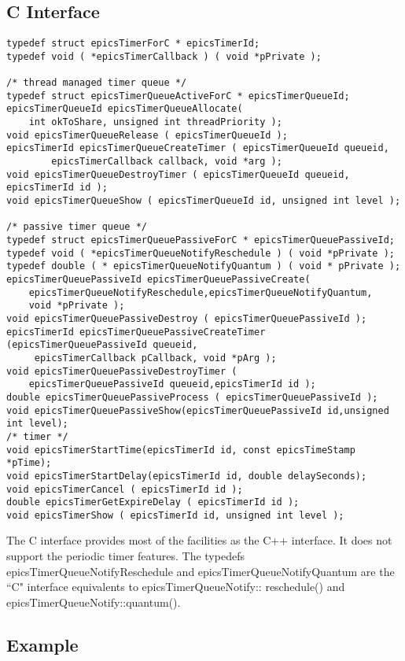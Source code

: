 \subsection{C Interface}

\begin{verbatim}typedef struct epicsTimerForC * epicsTimerId;
typedef void ( *epicsTimerCallback ) ( void *pPrivate );

/* thread managed timer queue */
typedef struct epicsTimerQueueActiveForC * epicsTimerQueueId;
epicsTimerQueueId epicsTimerQueueAllocate(
    int okToShare, unsigned int threadPriority );
void epicsTimerQueueRelease ( epicsTimerQueueId );
epicsTimerId epicsTimerQueueCreateTimer ( epicsTimerQueueId queueid,
        epicsTimerCallback callback, void *arg );
void epicsTimerQueueDestroyTimer ( epicsTimerQueueId queueid, epicsTimerId id );
void epicsTimerQueueShow ( epicsTimerQueueId id, unsigned int level );

/* passive timer queue */
typedef struct epicsTimerQueuePassiveForC * epicsTimerQueuePassiveId;
typedef void ( *epicsTimerQueueNotifyReschedule ) ( void *pPrivate );
typedef double ( * epicsTimerQueueNotifyQuantum ) ( void * pPrivate );
epicsTimerQueuePassiveId epicsTimerQueuePassiveCreate(
    epicsTimerQueueNotifyReschedule,epicsTimerQueueNotifyQuantum,
    void *pPrivate );
void epicsTimerQueuePassiveDestroy ( epicsTimerQueuePassiveId );
epicsTimerId epicsTimerQueuePassiveCreateTimer (epicsTimerQueuePassiveId queueid,
     epicsTimerCallback pCallback, void *pArg );
void epicsTimerQueuePassiveDestroyTimer (
    epicsTimerQueuePassiveId queueid,epicsTimerId id );
double epicsTimerQueuePassiveProcess ( epicsTimerQueuePassiveId );
void epicsTimerQueuePassiveShow(epicsTimerQueuePassiveId id,unsigned int level);
/* timer */
void epicsTimerStartTime(epicsTimerId id, const epicsTimeStamp *pTime);
void epicsTimerStartDelay(epicsTimerId id, double delaySeconds);
void epicsTimerCancel ( epicsTimerId id );
double epicsTimerGetExpireDelay ( epicsTimerId id );
void epicsTimerShow ( epicsTimerId id, unsigned int level );
\end{verbatim}The C interface provides most of the facilities as the C++ interface. It does not support the periodic timer features. The 
typedefs epicsTimerQueueNotifyReschedule and epicsTimerQueueNotifyQuantum are the ``C" interface equivalents to 
epicsTimerQueueNotify:: reschedule() and epicsTimerQueueNotify::quantum().

\subsection{Example}


